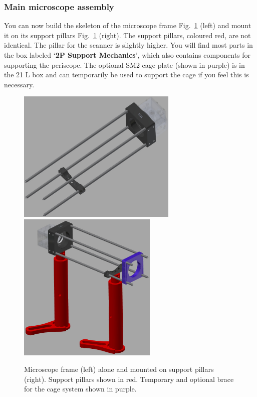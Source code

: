 \documentclass[a4paper]{report}
\begin{document}
\subsubsection{Main microscope assembly}
You can now build the skeleton of the microscope frame Fig.~\ref{fig:frame} (left) and mount it on its support pillars Fig.~\ref{fig:frame} (right).
The support pillars, coloured red, are not identical. 
The pillar for the scanner is slightly higher. 
You will find most parts in the box labeled `\textbf{2P Support Mechanics}', which also contains components for supporting the periscope.
The optional SM2 cage plate (shown in purple) is in the 21 L box and can temporarily be used to support the cage if you feel this is necessary. 

\begin{figure}[h]
\center
\includegraphics[width=3in]{frame.eps}
\includegraphics[width=2.61in]{mount_frame.eps}
\caption{Microscope frame (left) alone and mounted on support pillars (right). Support pillars shown in red. Temporary and optional brace for the cage system shown in purple.}
\label{fig:frame}
\end{figure}
\end{document}
